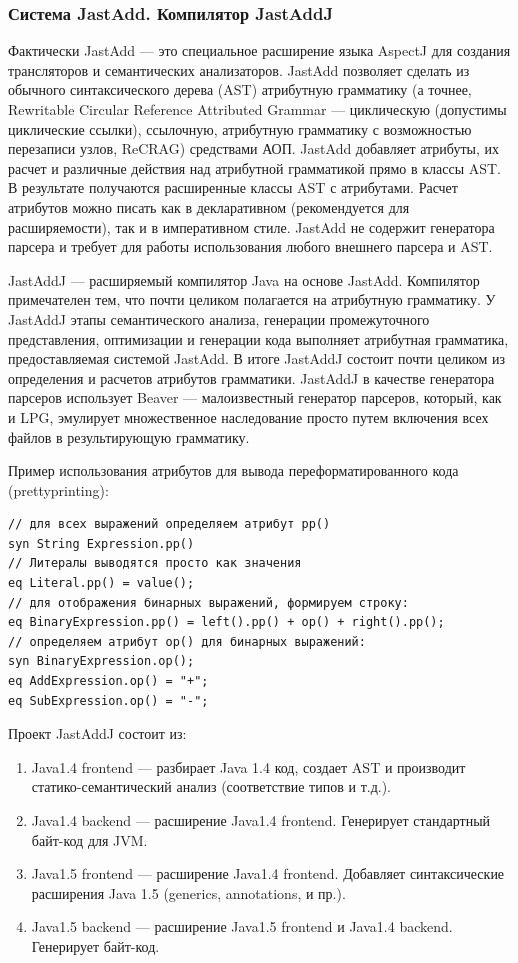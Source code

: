 \documentclass[a4paper,12pt,titlepage]{extarticle}
\begin{document}
\subsubsection*{Система JastAdd. Компилятор JastAddJ}
\label{jastadd}
Фактически JastAdd --- это специальное расширение языка AspectJ для создания
трансляторов и семантических анализаторов. JastAdd позволяет сделать из
обычного синтаксического дерева (AST) атрибутную грамматику (а точнее, 
Rewritable Circular Reference Attributed Grammar --- циклическую (допустимы
циклические ссылки), ссылочную, атрибутную грамматику с возможностью
перезаписи узлов, ReCRAG) средствами АОП. JastAdd добавляет атрибуты, их расчет
и различные действия над атрибутной грамматикой прямо в классы AST. В
результате получаются расширенные классы AST с атрибутами. Расчет атрибутов
можно писать как в декларативном (рекомендуется для расширяемости), так и в
императивном стиле. JastAdd не содержит генератора парсера и требует
для работы использования любого внешнего парсера и AST.

JastAddJ --- расширяемый компилятор Java на основе JastAdd. Компилятор
примечателен тем, что почти целиком полагается на атрибутную грамматику. У
JastAddJ этапы семантического анализа, генерации промежуточного представления,
оптимизации и генерации кода выполняет атрибутная грамматика, предоставляемая
системой JastAdd. В итоге JastAddJ состоит почти целиком из определения и
расчетов атрибутов грамматики. JastAddJ в качестве генератора парсеров
использует Beaver --- малоизвестный генератор парсеров, который, как и LPG,
эмулирует множественное наследование просто путем включения всех файлов в
результирующую грамматику.

Пример использования атрибутов для вывода переформатированного кода
(prettyprinting):
\begin{verbatim}
// для всех выражений определяем атрибут pp()
syn String Expression.pp()
// Литералы выводятся просто как значения
eq Literal.pp() = value();
// для отображения бинарных выражений, формируем строку:
eq BinaryExpression.pp() = left().pp() + op() + right().pp();
// определяем атрибут op() для бинарных выражений:
syn BinaryExpression.op();
eq AddExpression.op() = "+";
eq SubExpression.op() = "-";
\end{verbatim}

Проект JastAddJ состоит из:
\begin{enumerate}
  \item Java1.4 frontend --- разбирает Java 1.4 код, создает AST и производит
  статико-семантический анализ (соответствие типов и т.д.).
  \item Java1.4 backend --- расширение Java1.4 frontend. Генерирует стандартный байт-код
  для JVM.
  \item Java1.5 frontend --- расширение Java1.4 frontend. Добавляет синтаксические
  расширения Java 1.5 (generics, annotations, и пр.).
  \item Java1.5 backend --- расширение Java1.5 frontend и Java1.4 backend. Генерирует
  байт-код.
\end{enumerate}
\end{document}
